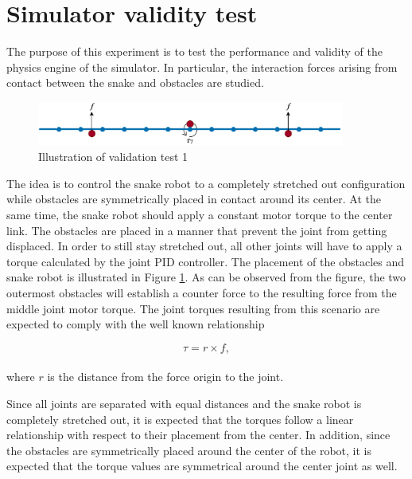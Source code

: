 \section{Simulator validity test}

The purpose of this experiment is to test the performance and validity of the physics engine of the simulator. In particular, the interaction forces arising from contact between the snake and obstacles are studied.

\begin{figure}
    \centering
    \includegraphics[width=0.9\textwidth]{figures/experiments/exp_valid1.pdf}
    \caption{Illustration of validation test 1}
    \label{fig:valid1_sketch}
\end{figure}

The idea is to control the snake robot to a completely stretched out configuration while obstacles are symmetrically placed in contact around its center. At the same time, the snake robot should apply a constant motor torque to the center link. The obstacles are placed in a manner that prevent the joint from getting displaced. In order to still stay stretched out, all other joints will have to apply a torque calculated by the joint PID controller. The placement of the obstacles and snake robot is illustrated in Figure \ref{fig:valid1_sketch}. As can be observed from the figure, the two outermost obstacles will establish a counter force to the resulting force from the middle joint motor torque. The joint torques resulting from this scenario are expected to comply with the well known relationship

\begin{equation}
    \tau = r\times f,
\end{equation}
\\
where $r$ is the distance from the force origin to the joint.

Since all joints are separated with equal distances and the snake robot is completely stretched out, it is expected that the torques follow a linear relationship with respect to their placement from the center. In addition, since the obstacles are symmetrically placed around the center of the robot, it is expected that the torque values are symmetrical around the center joint as well.

